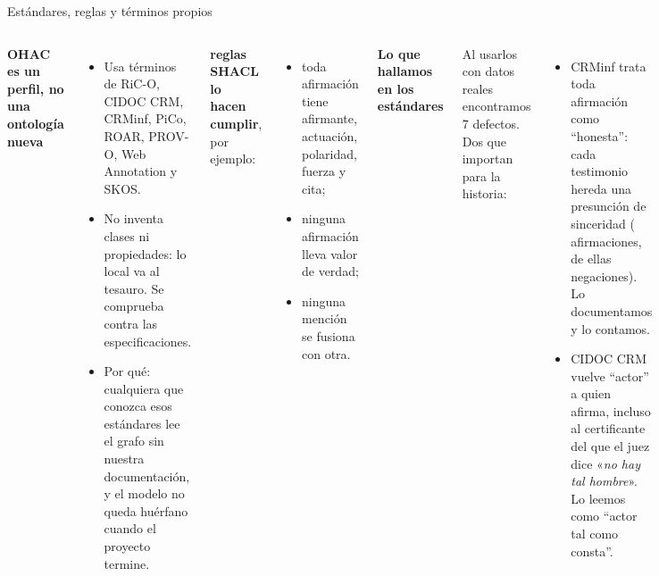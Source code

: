 \documentclass[aspectratio=169,10pt]{beamer}
\newcommand{\cita}[1]{«\textit{#1}»}
\begin{document}
\begin{frame}{Estándares, reglas y \cifraTerminosPropios{} términos propios}
\begin{columns}[T]
\small
\textbf{OHAC es un perfil, no una ontología nueva}
\begin{itemize}\footnotesize
\item Usa términos de RiC-O, CIDOC CRM, CRMinf, PiCo, ROAR, PROV-O, Web Annotation y SKOS.
\item \alert{No inventa clases ni propiedades}: lo local va al tesauro. Se comprueba contra las especificaciones.
\item Por qué: cualquiera que conozca esos estándares lee el grafo sin nuestra documentación, y el modelo no queda
      huérfano cuando el proyecto termine.
\end{itemize}
\textbf{\cifraFormas{} reglas SHACL lo hacen cumplir}, por ejemplo:
\begin{itemize}\footnotesize
\item toda afirmación tiene afirmante, actuación, polaridad, fuerza y cita;
\item ninguna afirmación lleva valor de verdad;
\item ninguna mención se fusiona con otra.
\end{itemize}
\small
\textbf{Lo que hallamos en los estándares}

\smallskip
\footnotesize Al usarlos con datos reales encontramos 7 defectos. Dos que importan para la historia:
\begin{itemize}\footnotesize
\item CRMinf trata toda afirmación como \enquote{honesta}: cada testimonio hereda una \alert{presunción de sinceridad}
      (\cifraDSeisAfirmaciones{} afirmaciones, \cifraDSeisNegaciones{} de ellas negaciones). Lo documentamos y lo
      contamos.
\item CIDOC CRM vuelve \enquote{actor} a quien afirma, incluso al certificante del que el juez dice \cita{no hay tal
      hombre}. Lo leemos como \enquote{actor tal como consta}.
\end{itemize}
\end{columns}
\end{frame}
\end{document}
